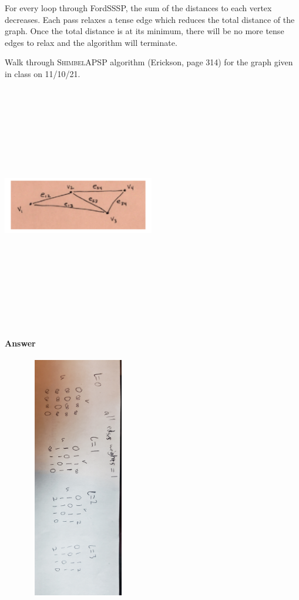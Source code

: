 \documentclass{article}
\begin{document}
For every loop through FordSSSP, the sum of the distances to each vertex decreases.
Each pass relaxes a tense edge which reduces the total distance of the graph. Once
the total distance is at its minimum, there will be no more tense edges to relax
and the algorithm will terminate.


Walk through \textsc{ShimbelAPSP} algorithm (Erickson, page 314) for the graph given in class on
11/10/21.

\includegraphics[width=250,height=400,keepaspectratio]{432-111021-graph.png}

\paragraph{Answer}

\includegraphics[width=250,height=400,keepaspectratio,angle=90]{q6Walkthrough.jpg}
\end{document}
